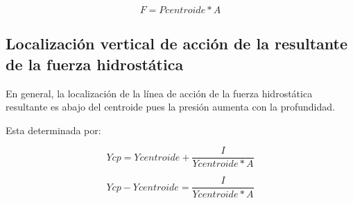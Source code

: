 \documentclass{article}
\begin{document}
\begin{equation}
F = Pcentroide * A 
\end{equation}

\subsection{Localización vertical de acción de la resultante de la fuerza hidrostática}
En general, la localización de la línea de acción de la fuerza hidrostática resultante es abajo del centroide pues la presión aumenta con la profundidad.

Esta determinada por: 

\begin{equation}
Ycp = Ycentroide + \dfrac {I}{Ycentroide*A}
\end{equation}

\begin{equation}
Ycp - Ycentroide = \dfrac {I}{Ycentroide*A}
\end{equation}
\end{document}
